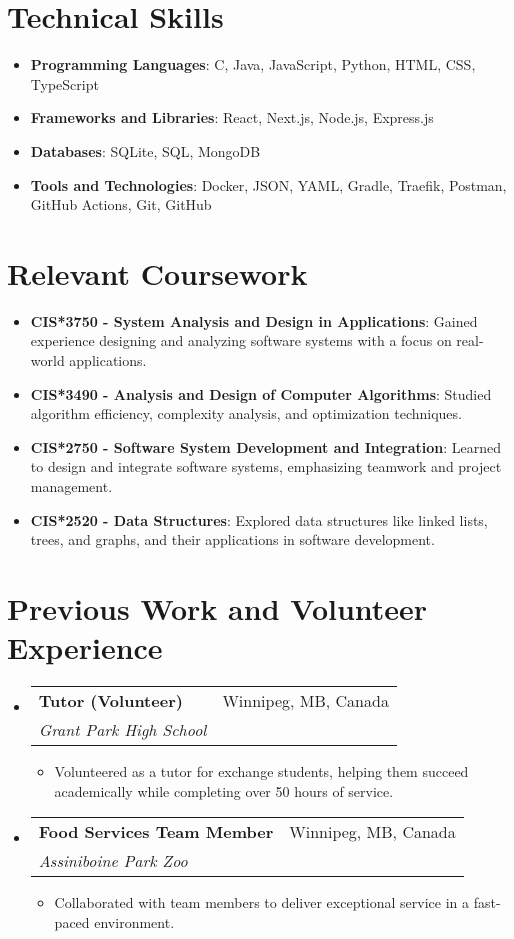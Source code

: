 \documentclass[letterpaper,11pt]{article}
\makeatletter
\newcommand{\resumeItem}[2]{
  \item\small{
    \textbf{#1}{: #2}
  }
}
\newcommand{\resumeSubheading}[4]{
  \vspace{-1pt}\item
    \begin{tabular*}{0.97\textwidth}[t]{l@{\extracolsep{\fill}}r}
      \textbf{#1} & #2 \\
      \textit{\small#3} & \textit{\small#4} \\
    \end{tabular*}
}
\newcommand{\resumeSubItem}[2]{\resumeItem{#1}{#2}}
\newcommand{\resumeSubHeadingListStart}{\begin{itemize}[leftmargin=*]}
\newcommand{\resumeSubHeadingListEnd}{\end{itemize}}
\newcommand{\resumeItemListStart}{\begin{itemize}}
\newcommand{\resumeItemListEnd}{\end{itemize}}
\makeatother
\begin{document}
\section{Technical Skills}
  \resumeSubHeadingListStart
    \resumeItem{Programming Languages}{C, Java, JavaScript, Python, HTML, CSS, TypeScript}
    \resumeItem{Frameworks and Libraries}{React, Next.js, Node.js, Express.js}
    \resumeItem{Databases}{SQLite, SQL, MongoDB}
    \resumeItem{Tools and Technologies}{Docker, JSON, YAML, Gradle, Traefik, Postman, GitHub Actions, Git, GitHub}
  \resumeSubHeadingListEnd

\section{Relevant Coursework}
  \resumeSubHeadingListStart
    \resumeSubItem{CIS*3750 - System Analysis and Design in Applications}{Gained experience designing and analyzing software systems with a focus on real-world applications.}
    \resumeSubItem{CIS*3490 - Analysis and Design of Computer Algorithms}{Studied algorithm efficiency, complexity analysis, and optimization techniques.}
    \resumeSubItem{CIS*2750 - Software System Development and Integration}{Learned to design and integrate software systems, emphasizing teamwork and project management.}
    \resumeSubItem{CIS*2520 - Data Structures}{Explored data structures like linked lists, trees, and graphs, and their applications in software development.}
  \resumeSubHeadingListEnd

\section{Previous Work and Volunteer Experience}
  \resumeSubHeadingListStart
    \resumeSubheading
      {Tutor (Volunteer)}{Winnipeg, MB, Canada}
      {Grant Park High School}{}
      \resumeItemListStart
        \item Volunteered as a tutor for exchange students, helping them succeed academically while completing over 50 hours of service.
      \resumeItemListEnd

    \resumeSubheading
      {Food Services Team Member}{Winnipeg, MB, Canada}
      {Assiniboine Park Zoo}{}
      \resumeItemListStart
        \item Collaborated with team members to deliver exceptional service in a fast-paced environment.
      \resumeItemListEnd
  \resumeSubHeadingListEnd

\end{document}
